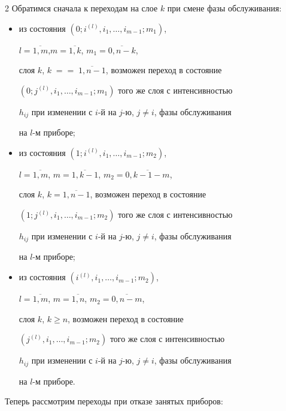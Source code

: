 \begin{multicols}{2}
Обратимся сначала к переходам на слое $k$ при смене фазы обслуживания:


\begin{itemize}


\item из состояния $\left (0;i^{(l)},i_1,\ldots,i_{m-1};m_1\right )$,


$l=\overline{1,m}$,\linebreak $m=\overline{1,k}$, $m_1=\overline{0,n-k}$,


слоя $k$, $k\;=$\linebreak $=\;\overline{1,n-1}$, возможен переход в состояние


$\left (0;j^{(l)},i_1,\ldots,i_{m-1};m_1\right )$ того же слоя с интенсивностью


$h_{ij}$ при изменении с $i$-й на $j$-ю, $j\ne i$, фазы обслуживания


на $l$-м приборе;


\item


 из состояния $\left(1;i^{(l)},i_1,\ldots,i_{m-1};m_2\right)$,


$l=\overline{1,m}$, $m=\overline{1,k-1}$, $m_2=\overline{0,k-1-m}$,


слоя $k$, $k=\overline{1,n-1}$, возможен переход в состояние


$\left (1;j^{(l)},i_1,\ldots,i_{m-1};m_2\right )$ того же слоя с интенсивностью


$h_{ij}$ при изменении с $i$-й на $j$-ю, $j\ne i$, фазы обслуживания


на $l$-м приборе;


\item


 из состояния $\left (i^{(l)},i_1,\ldots,i_{m-1};m_2\right )$,


$l=\overline{1,m}$, $m=\overline{1,n}$, $m_2=\overline{0,n-m}$,


слоя $k$, $k\ge n$, возможен переход в состояние


$\left (j^{(l)},i_1,\ldots,i_{m-1};m_2\right )$ того же слоя с интенсивностью


$h_{ij}$ при изменении с $i$-й на $j$-ю, $j\ne i$, фазы обслуживания


на $l$-м приборе.


\end{itemize}





Теперь рассмотрим переходы при отказе занятых приборов:



\end{multicols}
